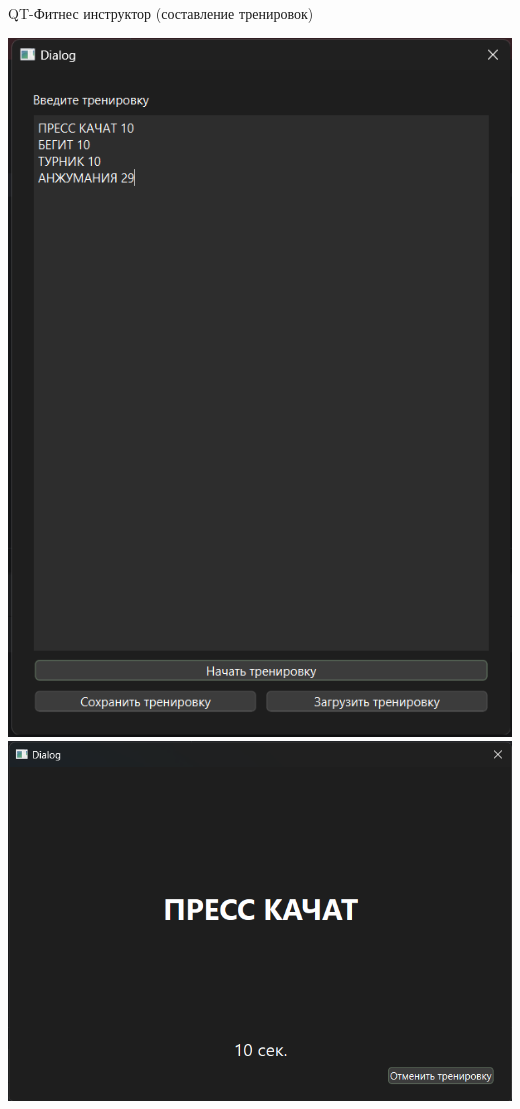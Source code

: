 \documentclass[a4paper,14pt]{extarticle}
\begin{document}
QT-Фитнес инструктор (составление тренировок)\\
\begin{center}
    \includegraphics[width=140mm]{init_train.png}
    \includegraphics[width=140mm]{train.png}
\end{center}
\end{document}
